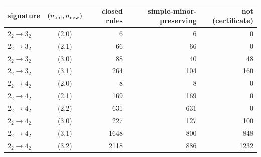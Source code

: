 \begin{tabular}{lcrrr}
\toprule
signature & $(n_{\rm old},n_{\rm new})$ & closed rules & simple-minor-preserving & not (certificate)\\
\midrule
$2_2\to3_2$ & (2,0) & 6 & 6 & 0\\
$2_2\to3_2$ & (2,1) & 66 & 66 & 0\\
$2_2\to3_2$ & (3,0) & 88 & 40 & 48\\
$2_2\to3_2$ & (3,1) & 264 & 104 & 160\\
$2_2\to4_2$ & (2,0) & 8 & 8 & 0\\
$2_2\to4_2$ & (2,1) & 169 & 169 & 0\\
$2_2\to4_2$ & (2,2) & 631 & 631 & 0\\
$2_2\to4_2$ & (3,0) & 227 & 127 & 100\\
$2_2\to4_2$ & (3,1) & 1648 & 800 & 848\\
$2_2\to4_2$ & (3,2) & 2118 & 886 & 1232\\
\bottomrule
\end{tabular}
